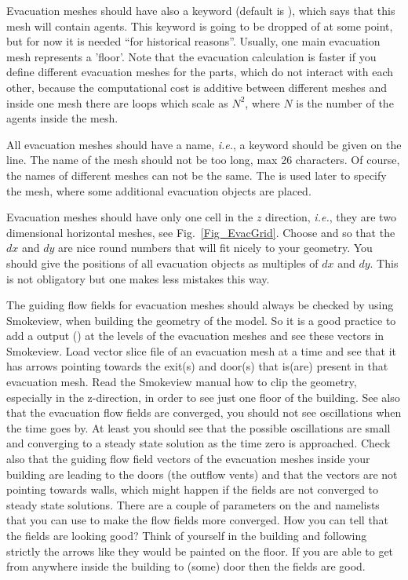 \documentclass[12pt,a4paper,final,twoside]{stylevk}
\begin{document}
Evacuation meshes should have also a keyword
 (default is ), which says
that this mesh will contain agents.  This keyword is going to be
dropped of at some point, but for now it is needed ``for historical
reasons''.  Usually, one main evacuation mesh represents a 'floor'.
Note that the evacuation calculation is faster if you define different
evacuation meshes for the parts, which do not interact with each
other, because the computational cost is additive between different
meshes and inside one mesh there are loops which scale as $N^2$, where
$N $ is the number of the agents inside the mesh.


All evacuation meshes should have a name, \emph{i.e.}, a keyword
 should be given on the  line.  The name of
the mesh should not be too long, max 26 characters.  Of course, the
names of different meshes can not be the same.  The  is used
later to specify the mesh, where some additional evacuation objects
are placed.


Evacuation meshes should have only one cell in the $z$ direction,
\emph{i.e.}, they are two dimensional horizontal meshes, see
Fig.~\ref{Fig_EvacGrid}.  Choose  and  so that
the $dx$ and $dy$ are nice round numbers that will fit nicely to your
geometry.  You should give the positions of all evacuation objects as
multiples of $dx$ and $dy$.  This is not obligatory but one makes less
mistakes this way.  


The guiding flow fields for evacuation meshes should always be checked
by using Smokeview, when building the geometry of the model.  So it is
a good practice to add a  output () at the levels of the
evacuation meshes and see these vectors in Smokeview.  Load vector
slice file of an evacuation mesh at a time and see that it has arrows
pointing towards the exit(s) and door(s) that is(are) present in that
evacuation mesh.  Read the Smokeview manual how to clip the
geometry, especially in the z-direction, in order to see just one
floor of the building.  See also that the evacuation flow fields are
converged, you should not see oscillations when the time goes by.  At
least you should see that the possible oscillations are small and
converging to a steady state solution as the time zero is approached.
Check also that the guiding flow field vectors of the evacuation
meshes inside your building are leading to the doors (the outflow
vents) and that the vectors are not pointing towards walls, which
might happen if the fields are not converged to steady state
solutions.  There are a couple of parameters on the  and
 namelists that you can use to make the flow fields more
converged.  How you can tell that the fields are looking good? Think
of yourself in the building and following strictly the arrows like
they would be painted on the floor.  If you are able to get from
anywhere inside the building to (some) door then the fields are good.
\end{document}
